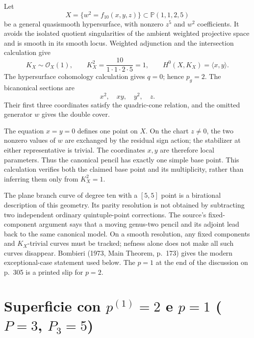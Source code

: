 \begin{example}
\label{cp2-viii-weighted-example}
Let
\[
X=\{w^2=f_{10}(x,y,z)\}\subset\mathbb P(1,1,2,5)
\]
be a general quasismooth hypersurface, with nonzero \(z^5\) and \(w^2\) coefficients. It avoids the isolated quotient singularities of the ambient weighted projective space and is smooth in its smooth locus. Weighted adjunction and the intersection calculation give
\[
K_X\sim\mathcal O_X(1),\qquad
K_X^2=\frac{10}{1\cdot1\cdot2\cdot5}=1,\qquad
H^0(X,K_X)=\langle x,y\rangle.
\]
The hypersurface cohomology calculation gives \(q=0\); hence \(p_g=2\). The bicanonical sections are
\[
x^2,\quad xy,\quad y^2,\quad z.
\]
Their first three coordinates satisfy the quadric-cone relation, and the omitted generator \(w\) gives the double cover.

The equation \(x=y=0\) defines one point on \(X\). On the chart \(z\ne0\), the two nonzero values of \(w\) are exchanged by the residual sign action; the stabilizer at either representative is trivial. The coordinates \(x,y\) are therefore local parameters. Thus the canonical pencil has exactly one simple base point. This calculation verifies both the claimed base point and its multiplicity, rather than inferring them only from \(K_X^2=1\).
\end{example}

The plane branch curve of degree ten with a \([5,5]\) point is a birational description of this geometry. Its parity resolution is not obtained by subtracting two independent ordinary quintuple-point corrections. The source's fixed-component argument says that a moving genus-two pencil and its adjoint lead back to the same canonical model. On a smooth resolution, any fixed components and \(K_X\)-trivial curves must be tracked; nefness alone does not make all such curves disappear. Bombieri (1973, Main Theorem, p.~173) gives the modern exceptional-case statement used below. The \(p=1\) at the end of the discussion on p.~305 is a printed slip for \(p=2\).

\section{Superficie con \texorpdfstring{$p^{(1)}=2$}{p(1)=2} e \texorpdfstring{$p=1$}{p=1} (\texorpdfstring{$P=3$}{P=3}, \texorpdfstring{$P_3=5$}{P3=5})}
\label{cp2-viii-15}

